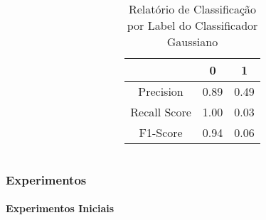 \documentclass{beamer}
\begin{document}
\begin{frame}
\begin{columns}
\begin{column}{0.5\textwidth}
\begin{table}[H]
\begin{small}
\begin{tabular}{ccc}
                        \hline
                    \end{tabular}
                \end{small}
            
            \end{table}
        \end{column}
        \begin{column}{0.5\textwidth}
            \begin{table}[H]

                \centering
                \caption{\label{tab:cr1-gnb} Relatório de Classificação por Label do Classificador Gaussiano}
                \begin{small}
                    \begin{tabular}{ccc}
                    
                        \hline
                                                & 0                & 1\\
                        \hline
                        Precision                & 0.89             & 0.49\\
                        Recall Score            & 1.00             & 0.03\\
                        F1-Score                & 0.94             & 0.06\\
                        
                        \hline
                    \end{tabular}
                \end{small}
            
            \end{table}
        \end{column}
        \end{columns}    
\end{frame}

\begin{frame}
    \frametitle{Experimentos}
    \framesubtitle{Experimentos Iniciais}
    
\end{frame}
\end{document}
